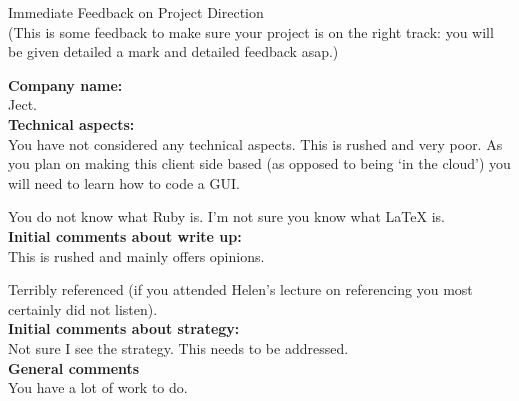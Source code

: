 \documentclass{article}
\begin{document}
\begin{center}
\Huge{Immediate Feedback on Project Direction}\\
\tiny{(This is some feedback to make sure your project is on the right track: you will be given detailed a mark and detailed feedback asap.)}
\end{center}


\normalsize
\textbf{Company name:}\\

Ject. \\

\textbf{Technical aspects:}\\

You have not considered any technical aspects.
This is rushed and very poor.
As you plan on making this client side based (as opposed to being `in the cloud') you will need to learn how to code a GUI.

You do not know what Ruby is.
I'm not sure you know what LaTeX is.\\

\textbf{Initial comments about write up:}\\

This is rushed and mainly offers opinions.

Terribly referenced (if you attended Helen's lecture on referencing you most certainly did not listen).\\

\textbf{Initial comments about strategy:}\\

Not sure I see the strategy.
This needs to be addressed.\\

\textbf{General comments}\\

You have a lot of work to do.
\end{document}

